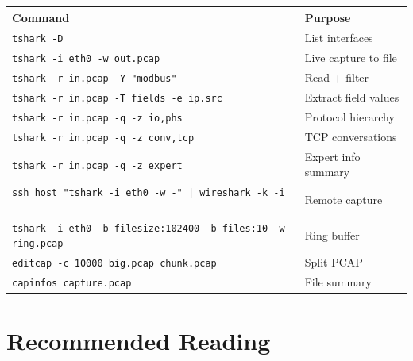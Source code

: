 \documentclass[12pt,twoside,openright]{memoir}
\begin{document}
\begin{quickref}
\begin{center}
\begin{tabular}{L{5.5cm}L{5.5cm}}
\toprule
\textbf{Command} & \textbf{Purpose} \\
\midrule
\texttt{tshark -D} & List interfaces \\
\texttt{tshark -i eth0 -w out.pcap} & Live capture to file \\
\texttt{tshark -r in.pcap -Y "modbus"} & Read + filter \\
\texttt{tshark -r in.pcap -T fields -e ip.src} & Extract field values \\
\texttt{tshark -r in.pcap -q -z io,phs} & Protocol hierarchy \\
\texttt{tshark -r in.pcap -q -z conv,tcp} & TCP conversations \\
\texttt{tshark -r in.pcap -q -z expert} & Expert info summary \\
\texttt{ssh host "tshark -i eth0 -w -" | wireshark -k -i -} & Remote capture \\
\texttt{tshark -i eth0 -b filesize:102400 -b files:10 -w ring.pcap} & Ring buffer \\
\texttt{editcap -c 10000 big.pcap chunk.pcap} & Split PCAP \\
\texttt{capinfos capture.pcap} & File summary \\
\bottomrule
\end{tabular}
\end{center}
\end{quickref}

\backmatter

\chapter*{Recommended Reading}
\end{document}

